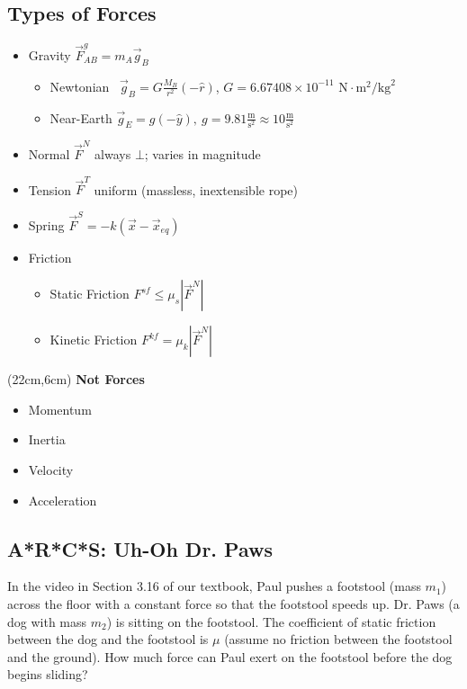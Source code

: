 \documentclass[]{article}
\begin{document}
\begin{PresentSpace}
\vspace{-10pt}
\section*{Types of Forces}
\vspace{-10pt}
\begin{itemize}
	\item Gravity \qquad \qquad \qquad \qquad $\vec{F}^{g}_{AB} = m_{A}\vec{g}_{B}$
	\begin{itemize}
		\item Newtonian \qquad\ $\vec{g}_{B} = G\frac{M_{B}}{r^{2}}(-\hat{r})$, $G = 6.67408\times10^{-11}\text{ N}\cdot\text{m}^{2}/\text{kg}^{2}$
		\item Near-Earth \qquad $\vec{g}_{E} = g(-\hat{y}),\ g=9.81\frac{\text{m}}{\text{s}^{2}} \approx 10\frac{\text{m}}{\text{s}^{2}}$
	\end{itemize}
	\item Normal \qquad $\vec{F}^{N}$ always $\bot$; varies in magnitude
	\item Tension \qquad $\vec{F}^{T}$ uniform (massless, inextensible rope)
	\item Spring \qquad $\vec{F}^{S}=-k(\vec{x}-\vec{x}_{eq})$
	\item Friction
	\begin{itemize}
		\item Static Friction \qquad $F^{sf}\leq\mu_{s}|\vec{F}^{N}|$
		\item Kinetic Friction \qquad $F^{kf}=\mu_{k}|\vec{F}^{N}|$
	\end{itemize}
\end{itemize}
\end{PresentSpace}
\begin{textblock*}{5cm}(22cm,6cm)
	\Large
	\noindent\textbf{Not Forces}
	\begin{itemize}
		\normalsize
		\item Momentum
		\item Inertia
		\item Velocity
		\item Acceleration
	\end{itemize}
\end{textblock*}
\newpage
\begin{TeacherMargin}

\end{TeacherMargin}
\begin{PresentSpace}
\vspace{-10pt}
\section*{A*R*C*S: Uh-Oh Dr. Paws}
In the video in Section 3.16 of our textbook, Paul pushes a footstool (mass $m_{1}$) across the floor with a constant force so that the footstool speeds up. Dr. Paws (a dog with mass $m_{2}$) is sitting on the footstool. The coefficient of static friction between the dog and the footstool is $\mu$ (assume no friction between the footstool and the ground). How much force can Paul exert on the footstool before the dog begins sliding?
\end{PresentSpace}
\end{document}
